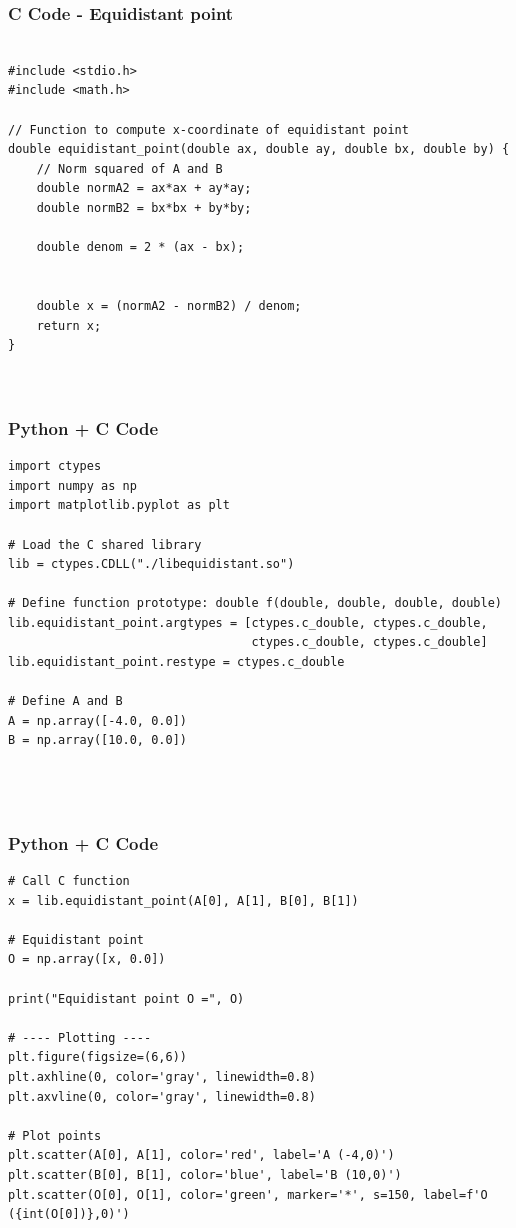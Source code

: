 \documentclass{beamer}
\begin{document}
\begin{frame}[fragile]
    \frametitle{C Code - Equidistant point}

    \begin{lstlisting}

#include <stdio.h>
#include <math.h>

// Function to compute x-coordinate of equidistant point
double equidistant_point(double ax, double ay, double bx, double by) {
    // Norm squared of A and B
    double normA2 = ax*ax + ay*ay;
    double normB2 = bx*bx + by*by;

    double denom = 2 * (ax - bx);

    
    double x = (normA2 - normB2) / denom;
    return x;
}



    \end{lstlisting}
\end{frame}

\begin{frame}[fragile]
    \frametitle{Python + C Code}
    \begin{lstlisting}
import ctypes
import numpy as np
import matplotlib.pyplot as plt

# Load the C shared library
lib = ctypes.CDLL("./libequidistant.so")

# Define function prototype: double f(double, double, double, double)
lib.equidistant_point.argtypes = [ctypes.c_double, ctypes.c_double,
                                  ctypes.c_double, ctypes.c_double]
lib.equidistant_point.restype = ctypes.c_double

# Define A and B
A = np.array([-4.0, 0.0])
B = np.array([10.0, 0.0])




    \end{lstlisting}
\end{frame}

\begin{frame}[fragile]
    \frametitle{Python + C Code}
    \begin{lstlisting}
# Call C function
x = lib.equidistant_point(A[0], A[1], B[0], B[1])

# Equidistant point
O = np.array([x, 0.0])

print("Equidistant point O =", O)

# ---- Plotting ----
plt.figure(figsize=(6,6))
plt.axhline(0, color='gray', linewidth=0.8)
plt.axvline(0, color='gray', linewidth=0.8)

# Plot points
plt.scatter(A[0], A[1], color='red', label='A (-4,0)')
plt.scatter(B[0], B[1], color='blue', label='B (10,0)')
plt.scatter(O[0], O[1], color='green', marker='*', s=150, label=f'O ({int(O[0])},0)')




    \end{lstlisting}
\end{frame}
\end{document}
